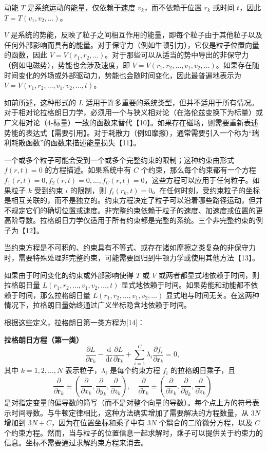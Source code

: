 动能 \( T \) 是系统运动的能量，仅依赖于速度 \( v_k \)，而不依赖于位置 \( r_k \) 或时间 \( t \)，因此 \( T = T(v_1, v_2, \dots) \)。

\( V \) 是系统的势能，反映了粒子之间相互作用的能量，即每个粒子由于其他粒子以及任何外部影响而具有的能量。对于保守力（例如牛顿引力），它仅是粒子位置向量的函数，因此 \( V = V(r_1, r_2, \dots) \)。对于那些可以从适当的势中导出的非保守力（例如电磁势），势能也会涉及速度，即 \( V = V(r_1, r_2, \dots, v_1, v_2, \dots) \)。如果存在随时间变化的外场或外部驱动力，势能也会随时间变化，因此最普遍地表示为 \( V = V(r_1, r_2, \dots, v_1, v_2, \dots, t) \)。

如前所述，这种形式的 \( L \) 适用于许多重要的系统类型，但并不适用于所有情况。对于相对论拉格朗日力学，必须用一个与狭义相对论（在洛伦兹变换下为标量）或广义相对论（4-标量）一致的函数来替代【10】。如果存在磁场，则需要重新表述势能的表达式【需要引用】。对于耗散力（例如摩擦），通常需要引入一个称为“瑞利耗散函数”的函数来描述能量损失【11】。

一个或多个粒子可能会受到一个或多个完整约束的限制；这种约束由形式 \( f(r, t) = 0 \) 的方程描述。如果系统中有 \( C \) 个约束，那么每个约束都有一个方程 \( f_1(r, t) = 0, f_2(r, t) = 0, \dots, f_C(r, t) = 0 \)，这些方程可以应用于任何粒子。如果粒子 \( k \) 受到约束 \( i \) 的限制，则 \( f_i(r_k, t) = 0 \)。在任何时刻，受约束粒子的坐标是相互关联的，而不是独立的。约束方程决定了粒子可以沿着哪些路径运动，但并不规定它们的确切位置或速度。非完整约束依赖于粒子的速度、加速度或位置的更高阶导数。拉格朗日力学仅适用于所有约束都是完整的系统。三个非完整约束的例子为【12】。

当约束方程是不可积的、约束具有不等式、或存在诸如摩擦之类复杂的非保守力时，需要特殊处理非完整约束，可能需要回归到牛顿力学或使用其他方法【13】。

如果由于时间变化的约束或外部影响使得 \( T \) 或 \( V \) 或两者都显式地依赖于时间，则拉格朗日量 \( L(r_1, r_2, \dots, v_1, v_2, \dots, t) \) 显式地依赖于时间。如果势能和动能都不依赖于时间，那么拉格朗日量 \( L(r_1, r_2, \dots, v_1, v_2, \dots) \) 显式地与时间无关。在这两种情况下，拉格朗日量始终通过广义坐标隐含地依赖于时间。

根据这些定义，拉格朗日第一类方程为[14]：

\textbf{拉格朗日方程（第一类）}
\[
\frac{\partial L}{\partial \mathbf{r}_{k}} - \frac{\mathrm{d}}{\mathrm{d}t} \frac{\partial L}{\partial \dot{\mathbf{r}}_{k}} + \sum_{i=1}^{C} \lambda_{i} \frac{\partial f_{i}}{\partial \mathbf{r}_{k}} = 0,~
\]
其中 \( k = 1, 2, \ldots, N \) 表示粒子，\(\lambda_{i}\) 是每个约束方程 \( f_{i} \) 的拉格朗日乘子，且
\[
\frac{\partial }{\partial \mathbf{r}_{k}} \equiv \left(\frac{\partial }{\partial x_{k}}, \frac{\partial }{\partial y_{k}}, \frac{\partial }{\partial z_{k}}\right), \quad \frac{\partial }{\partial \dot{\mathbf{r}}_{k}} \equiv \left(\frac{\partial }{\partial \dot{x}_{k}}, \frac{\partial }{\partial \dot{y}_{k}}, \frac{\partial }{\partial \dot{z}_{k}}\right)~
\]
是对指定变量的偏导数的简写（而不是对整个向量的导数）。每个点上方的符号表示时间导数。与牛顿定律相比，这种方法确实增加了需要解决的方程数量，从 \( 3N \) 增加到 \( 3N + C \)，因为在位置坐标和乘子中有 \( 3N \) 个耦合的二阶微分方程，以及 \( C \) 个约束方程。然而，当与粒子的位置信息一起求解时，乘子可以提供关于约束力的信息。坐标不需要通过求解约束方程来消去。

